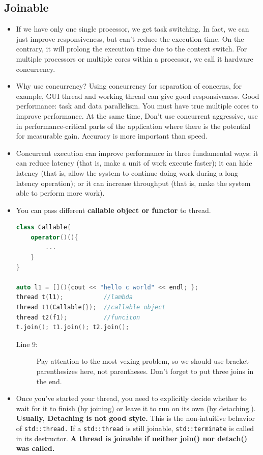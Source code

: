 \documentclass[a4paper,11pt,twoside]{book}
\begin{document}
\subsection{Joinable}
\begin{itemize}
	\item If we have only one single processor, we get task switching. In fact, we can just improve responsiveness, but can't reduce the execution time. On the contrary, it will prolong the execution time due to the context switch. For multiple processors or multiple cores within a processor, we call it hardware concurrency. 

	\item Why use concurrency?  Using concurrency for separation of concerns, for example, GUI thread and working thread can give good responsiveness.  Good performance: task and data parallelism. You must have true multiple cores to improve performance.  At the same time,  Don't use concurrent aggressive, use in performance-critical parts of the application where there is the potential for measurable gain. Accuracy is more important than speed. 

	\item Concurrent execution can improve performance in three fundamental ways: it can reduce latency (that is, make a unit of work execute faster); it can hide latency (that is, allow the system to continue doing work during a long-latency operation); or it can increase throughput (that is, make the system able to perform more work). 

	\item You can pass different \textbf{callable object or functor} to thread. 
\begin{lstlisting}[frame=single, language=c++]
class Callable{
	operator()(){
		...
	}
}

auto l1 = [](){cout << "hello c world" << endl; };
thread t(l1);           //lambda
thread t1(Callable{});  //callable object
thread t2(f1);          //funciton
t.join(); t1.join(); t2.join();
\end{lstlisting}

\begin{description}
	\item[Line 9:] Pay attention to the most vexing problem, so we should use bracket parenthesizes here, not parentheses. Don't forget to put three joins in the end.
\end{description}

	\item Once you've started your thread, you need to explicitly decide whether to wait for it to finish (by joining) or leave it to run on its own (by detaching.). \textbf{Usually, Detaching is not good style.} This is the non-intuitive behavior of \texttt{std::thread.} If a \texttt{std::thread} is still joinable, \texttt{std::terminate} is called in its destructor. \textbf{A thread is joinable if neither join() nor detach() was called.}
	

\end{itemize}
\end{document}
